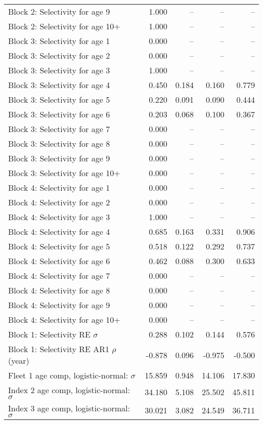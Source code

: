 \documentclass[
]{article}
\begin{document}
\begin{landscape}
\begin{longtable}[t]{lrrrr}
\addlinespace
Block 2: Selectivity for age 9 & 1.000 & -- & -- & --\\
Block 2: Selectivity for age 10+ & 1.000 & -- & -- & --\\
Block 3: Selectivity for age 1 & 0.000 & -- & -- & --\\
Block 3: Selectivity for age 2 & 0.000 & -- & -- & --\\
Block 3: Selectivity for age 3 & 1.000 & -- & -- & --\\
\addlinespace
Block 3: Selectivity for age 4 & 0.450 & 0.184 & 0.160 & 0.779\\
Block 3: Selectivity for age 5 & 0.220 & 0.091 & 0.090 & 0.444\\
Block 3: Selectivity for age 6 & 0.203 & 0.068 & 0.100 & 0.367\\
Block 3: Selectivity for age 7 & 0.000 & -- & -- & --\\
Block 3: Selectivity for age 8 & 0.000 & -- & -- & --\\
\addlinespace
Block 3: Selectivity for age 9 & 0.000 & -- & -- & --\\
Block 3: Selectivity for age 10+ & 0.000 & -- & -- & --\\
Block 4: Selectivity for age 1 & 0.000 & -- & -- & --\\
Block 4: Selectivity for age 2 & 0.000 & -- & -- & --\\
Block 4: Selectivity for age 3 & 1.000 & -- & -- & --\\
\addlinespace
Block 4: Selectivity for age 4 & 0.685 & 0.163 & 0.331 & 0.906\\
Block 4: Selectivity for age 5 & 0.518 & 0.122 & 0.292 & 0.737\\
Block 4: Selectivity for age 6 & 0.462 & 0.088 & 0.300 & 0.633\\
Block 4: Selectivity for age 7 & 0.000 & -- & -- & --\\
Block 4: Selectivity for age 8 & 0.000 & -- & -- & --\\
\addlinespace
Block 4: Selectivity for age 9 & 0.000 & -- & -- & --\\
Block 4: Selectivity for age 10+ & 0.000 & -- & -- & --\\
Block 1: Selectivity RE $\sigma$ & 0.288 & 0.102 & 0.144 & 0.576\\
Block 1: Selectivity RE AR1 $\rho$ (year) & -0.878 & 0.096 & -0.975 & -0.500\\
Fleet 1 age comp, logistic-normal: $\sigma$ & 15.859 & 0.948 & 14.106 & 17.830\\
\addlinespace
Index 2 age comp, logistic-normal: $\sigma$ & 34.180 & 5.108 & 25.502 & 45.811\\
Index 3 age comp, logistic-normal: $\sigma$ & 30.021 & 3.082 & 24.549 & 36.711\\*
\end{longtable}
\end{landscape}
\end{document}
